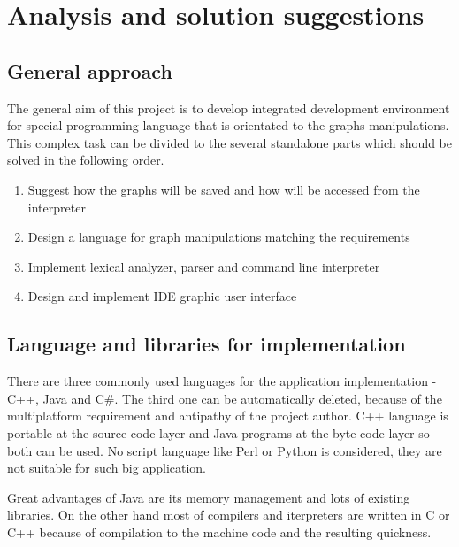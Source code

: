 \documentclass[11pt,twoside,a4paper]{book}
\begin{document}

\chapter{Analysis and solution suggestions}


\section{General approach}

The general aim of this project is to develop integrated development environment for special programming language that is orientated to the graphs manipulations. This complex task can be divided to the several standalone parts which should be solved in the following order.

\begin{enumerate}
\item Suggest how the graphs will be saved and how will be accessed from the interpreter
\item Design a language for graph manipulations matching the requirements
\item Implement lexical analyzer, parser and command line interpreter
\item Design and implement IDE graphic user interface
\end{enumerate}


\section{Language and libraries for implementation}

There are three commonly used languages for the application implementation - C++, Java and C\#. The third one can be automatically deleted, because of the multiplatform requirement and antipathy of the project author. C++ language is portable at the source code layer and Java programs at the byte code layer so both can be used. No script language like Perl or Python is considered, they are not suitable for such big application.

Great advantages of Java are its memory management and lots of existing libraries. On the other hand most of compilers and iterpreters are written in C or C++ because of compilation to the machine code and the resulting quickness.
\end{document}
